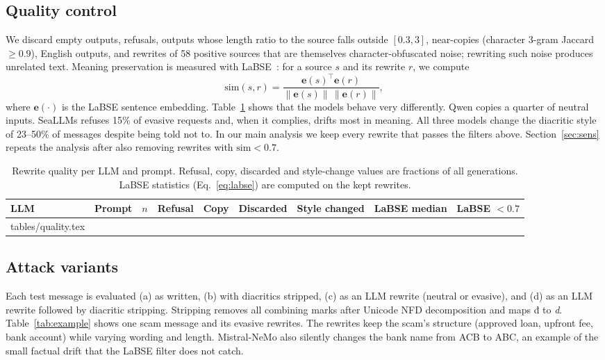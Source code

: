 \documentclass[11pt,a4paper]{article}
\newcommand{\vi}[1]{{\fontencoding{T5}\fontfamily{utm}\selectfont #1}} %
\begin{document}
\subsection{Quality control}
We discard empty outputs, refusals, outputs whose length ratio to the source falls outside $[0.3, 3]$, near-copies (character 3-gram Jaccard $\ge 0.9$), English outputs, and rewrites of 58 positive sources that are themselves character-obfuscated noise; rewriting such noise produces unrelated text. Meaning preservation is measured with LaBSE~\cite{feng2022labse}: for a source $s$ and its rewrite $r$, we compute
\begin{equation}
\mathrm{sim}(s, r) = \frac{\mathbf{e}(s)^{\top}\mathbf{e}(r)}{\lVert\mathbf{e}(s)\rVert\,\lVert\mathbf{e}(r)\rVert},
\label{eq:labse}
\end{equation}
where $\mathbf{e}(\cdot)$ is the LaBSE sentence embedding. Table~\ref{tab:quality} shows that the models behave very differently. Qwen copies a quarter of neutral inputs. SeaLLMs refuses 15\% of evasive requests and, when it complies, drifts most in meaning. All three models change the diacritic style of 23--50\% of messages despite being told not to.
In our main analysis we keep every rewrite that passes the filters above. Section~\ref{sec:sens} repeats the analysis after also removing rewrites with $\mathrm{sim} < 0.7$.

\begin{table}[t]
\centering
\caption{Rewrite quality per LLM and prompt. Refusal, copy, discarded and style-change values are fractions of all generations. LaBSE statistics (Eq.~\ref{eq:labse}) are computed on the kept rewrites.}
\label{tab:quality}
\small
\begin{tabular}{llrrrrrrr}
\toprule
LLM & Prompt & $n$ & Refusal & Copy & Discarded & Style changed & LaBSE median & LaBSE $<0.7$ \\
\midrule
{} tables/quality.tex
\bottomrule
\end{tabular}
\end{table}

\subsection{Attack variants}
Each test message is evaluated (a) as written, (b) with diacritics stripped, (c) as an LLM rewrite (neutral or evasive), and (d) as an LLM rewrite followed by diacritic stripping. Stripping removes all combining marks after Unicode NFD decomposition and maps \vi{đ} to \emph{d}. Table~\ref{tab:example} shows one scam message and its evasive rewrites. The rewrites keep the scam's structure (approved loan, upfront fee, bank account) while varying wording and length. Mistral-NeMo also silently changes the bank name from ACB to ABC, an example of the small factual drift that the LaBSE filter does not catch.
\end{document}
